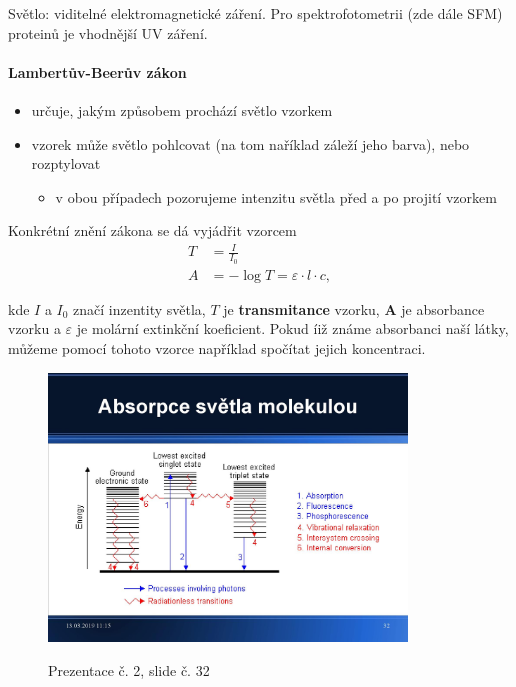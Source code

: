 \documentclass[DIV=8]{scrreprt}
\begin{document}
Světlo: viditelné elektromagnetické záření. Pro spektrofotometrii (zde dále SFM) proteinů je vhodnější UV záření.

\paragraph{Lambertův-Beerův zákon}
\begin{itemize}[nosep]
    \item určuje, jakým způsobem prochází světlo vzorkem
    \item vzorek může světlo pohlcovat (na tom naříklad záleží jeho barva), nebo rozptylovat
\begin{itemize}[nosep]
    \item v obou případech pozorujeme intenzitu světla před a po projití vzorkem
\end{itemize}

\end{itemize}



Konkrétní znění zákona se dá vyjádřit vzorcem
\begin{align*}T &= \frac{I}{I_0} \\
A &= -\log T = \varepsilon \cdot l \cdot c,\end{align*}

kde \(I\) a \(I_0\) značí inzentity světla, \(T\) je \textbf{transmitance} vzorku, \textbf{A} je absorbance vzorku a \(\varepsilon\) je molární extinkční koeficient. Pokud íiž známe absorbanci naší látky, můžeme pomocí tohoto vzorce například spočítat jejich koncentraci.

\begin{figure}
    \caption{Prezentace č. 2, slide č. 32}
    \includegraphics[width=0.85\textwidth]{slides-2/slide-32.jpg}
    \centering
    \label{slides-2-slide-32}
\end{figure}
\end{document}
